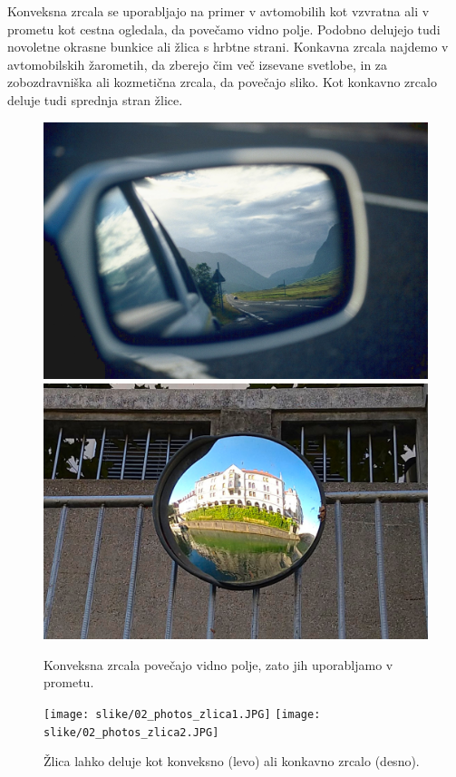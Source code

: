 \newpage
Konveksna zrcala se uporabljajo na primer v avtomobilih kot vzvratna ali v prometu kot
cestna ogledala, da povečamo vidno polje. Podobno delujejo tudi novoletne 
okrasne bunkice ali žlica s hrbtne strani. Konkavna zrcala najdemo v
avtomobilskih žarometih, da zberejo čim več izsevane svetlobe, in za zobozdravniška
ali kozmetična zrcala, da povečajo sliko. Kot konkavno zrcalo deluje tudi 
sprednja stran žlice.

\begin{figure}[!ht]
\centering
\includegraphics[width=7truecm]{slike/02_photos_avto.jpg}\hfill
\includegraphics[width=7truecm]{slike/02_photos_cestno.jpg}
\caption{Konveksna zrcala povečajo vidno polje, zato jih uporabljamo v prometu.}
\label{fig:02_photos-4}
\end{figure}

\begin{figure}[!ht]
\centering
\texttt{[image: slike/02\_photos\_zlica1.JPG]}\hfill
\texttt{[image: slike/02\_photos\_zlica2.JPG]}
\caption{Žlica lahko deluje kot konveksno (levo) ali konkavno zrcalo (desno).}
\label{fig:02_photos-5}
\end{figure}
